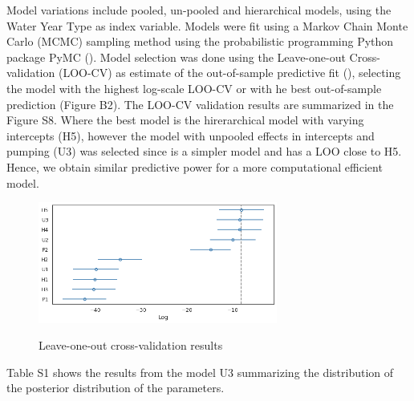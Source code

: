 \documentclass[11pt,a4paper]{article}
\begin{document}
Model variations include pooled, un-pooled and hierarchical models, using the Water Year Type as index variable. Models were fit using a Markov Chain Monte Carlo (MCMC) sampling method using the probabilistic programming Python package PyMC (\cite{salvatier_probabilistic_2016}). Model selection was done using the Leave-one-out Cross-validation (LOO-CV) as estimate of the out-of-sample predictive fit (\cite{vehtari_practical_2017}), selecting the model with the highest log-scale LOO-CV or with he best out-of-sample prediction (Figure B2). The LOO-CV validation results are summarized in the Figure S8. Where the best model is the hirerarchical model with varying intercepts (H5), however the model with unpooled effects in intercepts and pumping (U3) was selected since is a simpler model and has a LOO close to H5. Hence, we obtain similar predictive power for a more computational efficient model. 

\begin{figure}[H]
\centering
\includegraphics[width=0.7\textwidth]{model_comparison_calibration.png}
\label{fig:mesh1}
\caption{Leave-one-out cross-validation results}
\end{figure}

Table S1 shows the results from the model U3 summarizing the distribution of the posterior distribution of the parameters.
\end{document}
